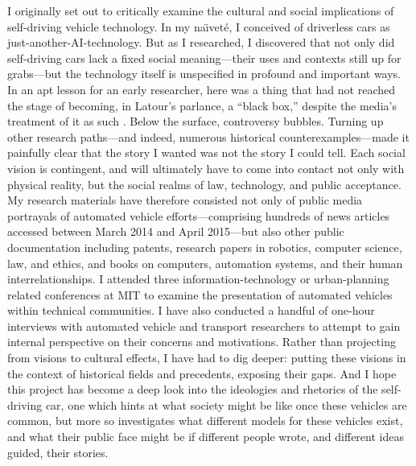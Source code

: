 


I originally set out to critically examine the cultural and social
implications of self-driving vehicle technology. In my na\"{\i}vet\'{e}, I
conceived of driverless cars as just-another-AI-technology. But as I
researched, I discovered that not only did 
self-driving cars lack a fixed social meaning---their uses and
contexts still up for grabs---but the technology itself is unspecified
in profound and important ways. In an apt lesson for an early researcher,
here was a thing that had not reached the stage of becoming, in
Latour's parlance, a ``black box,'' despite the media's treatment of
it as such \cite{LatourScience}. Below the surface, controversy
bubbles. Turning up other research paths---and indeed, numerous historical
counterexamples---made it painfully clear that the story I wanted was
not the story I could tell. Each social vision is
contingent, and will ultimately have to come into
contact not only with physical reality, but the social realms of law,
technology, and public acceptance. My research materials have
therefore consisted not only of public media portrayals of automated
vehicle efforts---comprising hundreds of news articles accessed
between March 2014 and April 2015---but also other public
documentation including patents, research papers in robotics,
computer science, law, and ethics, and books on computers, automation systems,
and their human 
interrelationships. I attended three information-technology or urban-planning
related conferences at MIT to examine the presentation of automated
vehicles within technical communities. I have also conducted a handful
of one-hour interviews with 
automated vehicle and transport researchers to attempt to gain
internal perspective on their concerns and motivations. Rather than
projecting from visions to cultural effects, I have had to dig deeper:
putting these visions in the context of 
historical fields and precedents, exposing their gaps. And I hope this project has become a  
deep look into the ideologies and rhetorics of the self-driving car,
one which hints at what society might be like once these
vehicles are common, but more so investigates what different models for these vehicles
exist, and what their public face might be if different people wrote,
and different ideas guided, their stories.

